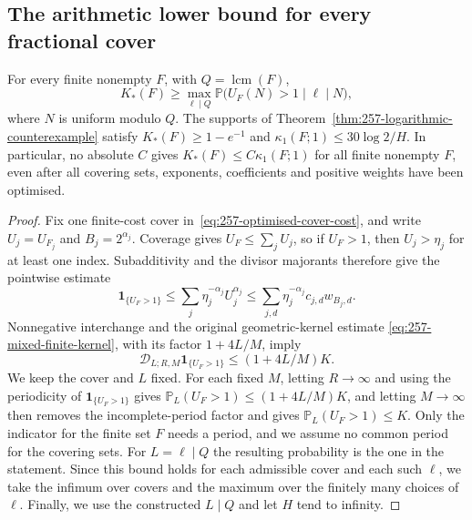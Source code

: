 \subsection{The arithmetic lower bound for every fractional cover}
\begin{cor}\label{cor:257-logarithmic-separation}
For every finite nonempty $F$, with $Q=\operatorname{lcm}(F)$,
\begin{equation}
 K_*(F)\ge\max_{\ell\mid Q}
   \mathbb P\bigl(U_F(N)>1\mid\ell\mid N\bigr),
 \label{eq:257-arithmetic-cover-lower}
\end{equation}
where $N$ is uniform modulo $Q$.
The supports of Theorem~\ref{thm:257-logarithmic-counterexample} satisfy
$K_*(F)\ge1-e^{-1}$ and $\kappa_1(F;1)\le30\log2/H$.
In particular, no absolute $C$ gives $K_*(F)\le C\kappa_1(F;1)$
for all finite nonempty $F$, even after all covering sets, exponents, coefficients
and positive weights have been optimised.
\end{cor}
\begin{proof}
Fix one finite-cost cover in~\eqref{eq:257-optimised-cover-cost}, and write
$U_j=U_{F_j}$ and $B_j=2^{\alpha_j}$.
Coverage gives $U_F\le\sum_jU_j$, so if $U_F>1$, then $U_j>\eta_j$
for at least one index.  Subadditivity and the divisor majorants therefore
give the pointwise estimate
\[
 \mathbf1_{\{U_F>1\}}
 \le\sum_j\eta_j^{-\alpha_j}U_j^{\alpha_j}
 \le\sum_{j,d}\eta_j^{-\alpha_j}c_{j,d}w_{B_j,d}.
\]
Nonnegative interchange and the original geometric-kernel estimate
\eqref{eq:257-mixed-finite-kernel}, with its factor $1+4L/M$, imply
\[
 \mathscr D_{L;R,M}\mathbf1_{\{U_F>1\}}\le(1+4L/M)K.
\]
We keep the cover and $L$ fixed. For each fixed $M$, letting $R\to\infty$
and using the periodicity of $\mathbf1_{\{U_F>1\}}$ gives
$\mathbb P_L(U_F>1)\le(1+4L/M)K$, and letting $M\to\infty$ then removes
the incomplete-period factor and gives
$\mathbb P_L(U_F>1)\le K$.
Only the indicator for the finite set $F$ needs a period, and we assume no common
period for the covering sets.
For $L=\ell\mid Q$ the resulting probability is the one in the statement.
Since this bound holds for each admissible cover and each such $\ell$,
we take the infimum over covers and the maximum over the finitely many
choices of $\ell$.  Finally, we use the constructed
$L\mid Q$ and let $H$ tend to infinity.
\end{proof}

